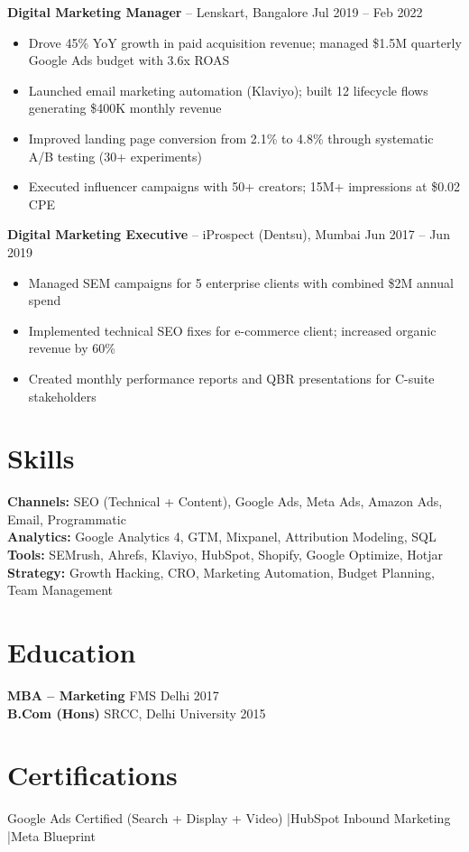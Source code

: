 \documentclass[10pt,a4paper]{article}
\begin{document}
\textbf{Digital Marketing Manager} -- Lenskart, Bangalore \hfill Jul 2019 -- Feb 2022
\begin{itemize}
  \item Drove 45\% YoY growth in paid acquisition revenue; managed \$1.5M quarterly Google Ads budget with 3.6x ROAS
  \item Launched email marketing automation (Klaviyo); built 12 lifecycle flows generating \$400K monthly revenue
  \item Improved landing page conversion from 2.1\% to 4.8\% through systematic A/B testing (30+ experiments)
  \item Executed influencer campaigns with 50+ creators; 15M+ impressions at \$0.02 CPE
\end{itemize}

\textbf{Digital Marketing Executive} -- iProspect (Dentsu), Mumbai \hfill Jun 2017 -- Jun 2019
\begin{itemize}
  \item Managed SEM campaigns for 5 enterprise clients with combined \$2M annual spend
  \item Implemented technical SEO fixes for e-commerce client; increased organic revenue by 60\%
  \item Created monthly performance reports and QBR presentations for C-suite stakeholders
\end{itemize}

\section{Skills}
\textbf{Channels:} SEO (Technical + Content), Google Ads, Meta Ads, Amazon Ads, Email, Programmatic\\
\textbf{Analytics:} Google Analytics 4, GTM, Mixpanel, Attribution Modeling, SQL\\
\textbf{Tools:} SEMrush, Ahrefs, Klaviyo, HubSpot, Shopify, Google Optimize, Hotjar\\
\textbf{Strategy:} Growth Hacking, CRO, Marketing Automation, Budget Planning, Team Management

\section{Education}
\textbf{MBA -- Marketing} \hfill FMS Delhi \hfill 2017\\
\textbf{B.Com (Hons)} \hfill SRCC, Delhi University \hfill 2015

\section{Certifications}
Google Ads Certified (Search + Display + Video) \quad|\quad HubSpot Inbound Marketing \quad|\quad Meta Blueprint
\end{document}
